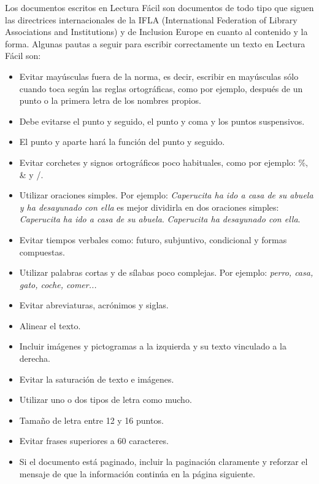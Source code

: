 	
Los documentos escritos en Lectura Fácil son documentos de todo tipo que siguen las directrices internacionales de la IFLA (International Federation of Library Associations and Institutions) y de Inclusion Europe en cuanto al contenido y la forma.
Algunas pautas a seguir para escribir correctamente un texto en Lectura Fácil son:
\citep{GarciaMunoz2012LecturaFacil}

\begin{itemize}
	\item Evitar mayúsculas fuera de la norma, es decir, escribir en mayúsculas sólo cuando toca según las reglas ortográficas, como por ejemplo, después de un punto o la primera letra de los nombres propios.
	\item Debe evitarse el punto y seguido, el punto y coma y los puntos suspensivos.
	\item El punto y aparte hará la función del punto y seguido.
	\item Evitar corchetes y signos ortográficos poco habituales, como por ejemplo: \%, \& y /.
	\item Utilizar oraciones simples. Por ejemplo: \textit{Caperucita ha ido a casa de su abuela y ha desayunado con ella} es mejor dividirla en dos oraciones simples:\textit{ Caperucita ha ido a casa de su abuela}. \textit{Caperucita ha desayunado con ella}.
	\item Evitar tiempos verbales como: futuro, subjuntivo, condicional y formas compuestas.
	\item Utilizar palabras cortas y de sílabas poco complejas. Por ejemplo: \textit{perro, casa, gato, coche, comer...}
	\item Evitar abreviaturas, acrónimos y siglas.
	\item Alinear el texto.
	\item Incluir imágenes y pictogramas a la izquierda y su texto vinculado a la derecha.
	\item Evitar la saturación de texto e imágenes.
	\item Utilizar uno o dos tipos de letra como mucho.
	\item Tamaño de letra entre 12 y 16 puntos.
	\item Evitar frases superiores a 60 caracteres.
	\item Si el documento está paginado, incluir la paginación claramente y reforzar el mensaje de que la información continúa en la página siguiente.
\end{itemize}

